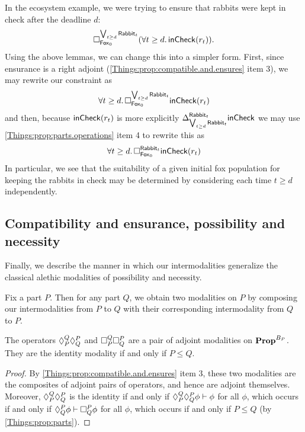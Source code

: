 \begin{ex}
In the ecosystem example, we were trying to ensure that rabbits were kept in check after the deadline $d$:
$$\ensure{\bigvee_{t \geq d }\type{Rabbit}_t}{\type{Fox}_0}(\forall t \geq d.\, \term{inCheck}(r_t)).$$
Using the above lemmas, we can change this into a simpler form. First, since ensurance is a right adjoint (\cref{Things:prop:compatible.and.ensures} item 3), we may rewrite our constraint as
\[
\forall t \geq d.\, \ensure{\bigvee_{t \geq d} \type{Rabbit}_t}{\type{Fox}_0}\term{inCheck}(r_t) 
\]
and then, because $\term{inCheck}(r_t)$ is more explicitly $\Delta_{\bigvee_{t \geq d} \type{Rabbit}_t}^{\type{Rabbit}_t}\term{inCheck}$ we may use \cref{Things:prop:parts.operations} item 4 to rewrite this as
\[
\forall t \geq d.\, \ensure{\type{Rabbit}_t}{\type{Fox}_0}\term{inCheck}(r_t) \]
In particular, we see that the suitability of a given initial fox population for keeping the rabbits in check may be determined by considering each time $t \geq d$ independently.
\end{ex}

\subsection{Compatibility and ensurance, possibility and necessity}\label{subsec.modal}

Finally, we describe the manner in which our intermodalities generalize the classical alethic modalities of possibility and necessity.

Fix a part $P$. Then for any part $Q$, we obtain two modalities on $P$ by composing our intermodalities from $P$ to $Q$ with their corresponding intermodality from $Q$ to $P$. 
\begin{prop}
The operators $\compat{Q}{P}\compat{P}{Q}$ and $\ensure{Q}{P}\ensure{P}{Q}$ are a pair of adjoint modalities on $\Prop^{B_P}$. They are the identity modality if and only if $P \leq Q$.
\end{prop}
\begin{proof}
By \cref{Things:prop:compatible.and.ensures} item 3, these two modalities are the composites of adjoint pairs of operators, and hence are adjoint themselves. Moreover, $\compat{Q}{P}\compat{P}{Q}$ is the identity if and only if $\compat{Q}{P}\compat{P}{Q} \phi \vdash \phi$ for all $\phi$, which occurs if and only if $\compat{P}{Q}\phi \vdash \ensure{P}{Q}\phi$ for all $\phi$, which occurs if and only if $P \leq Q$ (by \cref{Things:prop:parts}).
\end{proof}

